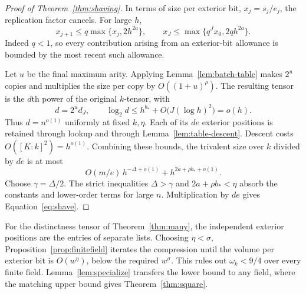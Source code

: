 \begin{proof}[Proof of Theorem~\ref{thm:shaving}]
In terms of size per exterior bit, $x_j=s_j/e_j$, the replication
factor cancels. For large $h$,
\[
 x_{j+1}\le q\max\{x_j,2h^{2a}\},\qquad
 x_J\le \max\{q^J x_0,2q h^{2a}\}.
\]
Indeed $q<1$, so every contribution arising from an exterior-bit
allowance is bounded by the most recent such allowance.

Let $u$ be the final maximum arity. Applying
Lemma~\ref{lem:batch-table} makes $2^u$ copies and multiplies the
size per copy by $O((1+u)^\rho)$. The resulting tensor is the
$d$th power of the original $k$-tensor, with
\[
 d=2^u d_J,\qquad
 \log_2 d\le h^{b_*}+O\bigl(J(\log h)^2\bigr)=o(h).
\]
Thus $d=n^{o(1)}$ uniformly at fixed $k,\eta$. Each of its $de$
exterior positions is retained through lookup and through
Lemma~\ref{lem:table-descent}. Descent costs $O([K:k]^2)=h^{o(1)}$.
Combining these bounds, the trivalent size over $k$ divided by $de$
is at most
\[
 O(m/e)\,h^{-\Delta+o(1)}
       +h^{2a+\rho b_*+o(1)} .
\]
Choose $\gamma=\Delta/2$. The strict inequalities
$\Delta>\gamma$ and $2a+\rho b_*<\eta$ absorb the constants and
lower-order terms for large $n$. Multiplication by $de$ gives
Equation~\eqref{eq:shave}.
\end{proof}

For the distinctness tensor of Theorem~\ref{thm:many}, the independent
exterior positions are the entries of separate lists. Choosing
$\eta<\sigma$, Proposition~\ref{prop:finitefield} iterates the
compression until the volume per exterior bit is $O(w^\eta)$, below
the required $w^\sigma$. This rules out $\omega_k<9/4$ over every
finite field. Lemma~\ref{lem:specialize} transfers the lower bound to
any field, where the matching upper bound gives Theorem~\ref{thm:square}.
